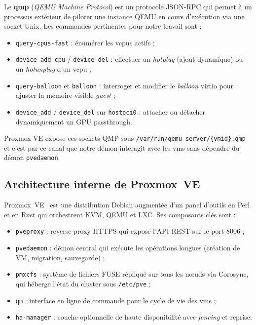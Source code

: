 Le \textbf{\acrshort{qmp}} (\emph{QEMU Machine Protocol}) est un protocole JSON-RPC qui permet à un processus extérieur de piloter une instance QEMU en cours d'exécution via une socket Unix. Les commandes pertinentes pour notre travail sont :

\begin{itemize}[leftmargin=*]
    \item \texttt{query-cpus-fast} : énumérer les \acrshort{vcpu}s actifs ;
    \item \texttt{device\_add cpu} / \texttt{device\_del} : effectuer un \emph{hotplug} (ajout dynamique) ou un \emph{hotunplug} d'un \acrshort{vcpu} ;
    \item \texttt{query-balloon} et \texttt{balloon} : interroger et modifier le \emph{balloon} virtio pour ajuster la mémoire visible \emph{guest} ;
    \item \texttt{device\_add} / \texttt{device\_del} sur \texttt{hostpci0} : attacher ou détacher dynamiquement un GPU passthrough.
\end{itemize}

Proxmox VE expose ces sockets QMP sous \texttt{/var/run/qemu-server/\{vmid\}.qmp} et c'est par ce canal que notre démon interagit avec les \acrshort{vm}s sans dépendre du démon \texttt{pvedaemon}.

\subsection{Architecture interne de Proxmox~VE}

Proxmox~VE~\cite{proxmox_doc} est une distribution Debian augmentée d'un panel d'outils en Perl et en Rust qui orchestrent KVM, QEMU et LXC. Ses composants clés sont :

\begin{itemize}[leftmargin=*]
    \item \texttt{pveproxy} : reverse-proxy HTTPS qui expose l'API REST sur le port 8006 ;
    \item \texttt{pvedaemon} : démon central qui exécute les opérations longues (création de VM, migration, sauvegarde) ;
    \item \texttt{pmxcfs} : système de fichiers FUSE répliqué sur tous les nœuds via Corosync, qui héberge l'état du cluster sous \texttt{/etc/pve} ;
    \item \texttt{qm} : interface en ligne de commande pour le cycle de vie des \acrshort{vm}s ;
    \item \texttt{ha-manager} : couche optionnelle de haute disponibilité avec \emph{fencing} et reprise.
\end{itemize}

